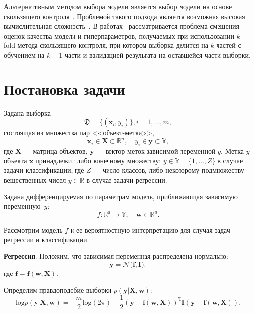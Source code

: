 Альтернативным методом выбора модели является выбор модели на основе скользящего контроля~\cite{cv_ms, tokmakova}. Проблемой такого подхода является возможная высокая вычислительная сложность~\cite{expensive,expensive2}. В работах~\cite{bias,bias2} рассматривается проблема смещения оценок качества модели и гиперпараметров, получаемых при использовании $k$-fold метода скользящего контроля, при котором выборка делится на $k$-частей с обучением на $k-1$ части и валидацией результата на оставшейся части выборки. 




\section{Постановка задачи}
Задана выборка  \begin{equation}\label{eq:dataset}\mathfrak{D} = \{(\mathbf{x}_i,y_i)\}, i = 1,\dots,m,\end{equation} состоящая из множества пар <<объект-метка>>, $$\mathbf{x}_i \in \mathbf{X} \subset \mathbb{R}^n, \quad {y}_i \in \mathbf{y} \subset \mathbb{Y},$$ где $\mathbf{X}$ --- матрица объектов,  $\mathbf{y}$ --- вектор меток зависимой переменной $y$. Метка ${y}$  объекта $\mathbf{x}$ принадлежит либо конечному множеству: ${y} \in \mathbb{Y} = \{1, \dots, Z\}$ в случае задачи классификации, где $Z$ --- число классов, либо некоторому подмножеству вещественных чисел ${y} \in  \mathbb{R}$ в случае задачи регрессии.

Задана дифференцируемая по параметрам модель, приближающая зависимую переменную~$y$:
\[
	f:\mathbb{R}^n \to \mathbb{Y}, \quad \mathbf{w} \in \mathbb{R}^u.
\]

Рассмотрим модель $f$ и ее вероятностную интерпретацию для случая задач регрессии и классификации. 

\textbf{Регрессия. }
Положим, что зависимая переменная распределена нормально:
\begin{equation}
\label{eq:reg}
\mathbf{y} = \mathcal{N}\bigl(\mathbf{f}, \mathbf{I}\bigr),
\end{equation}
где $\mathbf{f} = \mathbf{f}(\mathbf{w}, \mathbf{X})$.

Определим правдоподобие выборки $p(\mathbf{y}|\mathbf{X}, \mathbf{w})$:
\[
	\text{log}p(\mathbf{y}|\mathbf{X}, \mathbf{w}) =-\frac{m}{2}\text{log}(2\pi)   -\frac{1}{2}(\mathbf{y} - \mathbf{f}(\mathbf{w}, \mathbf{X}))^\text{T}\mathbf{I}(\mathbf{y} - \mathbf{f}(\mathbf{w}, \mathbf{X})).
\] 

